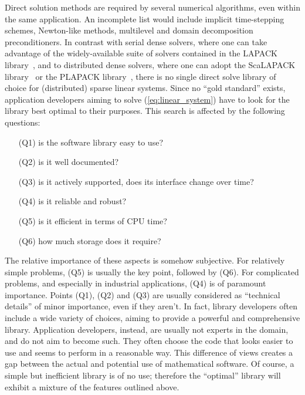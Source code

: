 \documentclass[acmtocl]{acmtrans2m}
\begin{document}
\smallskip

Direct solution methods are required by several numerical algorithms, even
within the same application. An
incomplete list would include implicit time-stepping schemes, 
Newton-like methods, multilevel and domain decomposition preconditioners. 
In contrast with serial dense solvers, where one can take advantage of the
widely-available suite of solvers contained in the LAPACK
library~\cite{lapack-guide}, and to distributed dense solvers, where one can
adopt the ScaLAPACK library~\cite{scalapack-guide} or the PLAPACK
library~\cite{alpatov97plapack}, there is no single direct solve library of
choice for (distributed) sparse linear systems.  Since no ``gold
standard'' exists, application developers aiming to solve
(\ref{eq:linear_system}) have to look
for the library best optimal to their purposes. This search is affected by the following questions:
\begin{enumerate}
\item[(Q1)] is the software library easy to use?
\item[(Q2)] is it well documented?
\item[(Q3)] is it actively supported, does its interface change over time?
\item[(Q4)] is it reliable and robust?
\item[(Q5)] is it efficient in terms of CPU time?
\item[(Q6)] how much storage does it require?
\end{enumerate}
The relative importance of these aspects is somehow subjective. For relatively
simple problems, (Q5) is usually the key point, followed by (Q6). For
complicated problems, and especially in industrial applications, (Q4) is of
paramount importance. Points (Q1), (Q2) and (Q3) are usually considered as
``technical details'' of minor importance, even if they aren't. 
In fact, library developers often include a wide variety
of choices, aiming to provide a powerful and comprehensive library.
Application developers, instead, are usually not experts in the domain, and do
not aim to become such. They often choose the code that looks easier to use and
seems to perform in a reasonable way. This difference of views creates a gap between
the actual and potential use of mathematical software.
Of course, a simple but inefficient library is of no use; therefore the
``optimal'' library will exhibit a mixture of the features outlined above.
\end{document}
